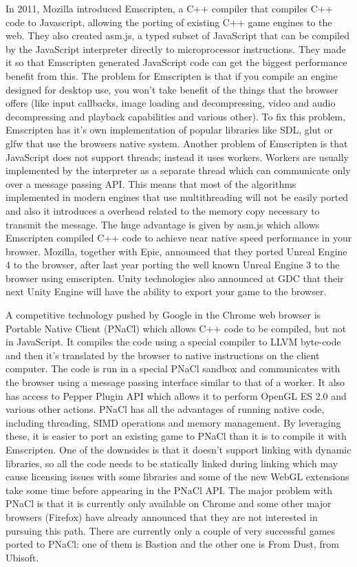 In 2011, Mozilla introduced Emscripten, a C++ compiler that compiles C++ code to
Javascript, allowing the porting of existing C++ game engines to the web. They also
created asm.js, a typed subset of JavaScript that can be compiled by the JavaScript
interpreter directly to microprocessor instructions. They made it so that Emscripten
generated JavaScript code can get the biggest performance benefit from this. The problem for Emscripten is that if you compile an engine designed for desktop use, you won’t take benefit of the things that the browser offers (like input callbacks, image loading and decompressing, video and audio decompressing and playback capabilities and various other). To fix this problem, Emscripten has it’s own implementation of popular libraries like SDL, glut or glfw that use the browsers native system. Another problem of Emscripten is that JavaScript does not support threads; instead it uses workers. Workers are usually implemented by the interpreter as a separate thread which can communicate only over a message passing API. This means that most of the algorithms implemented in modern engines that use multithreading will not be easily ported and also it introduces a overhead related to the memory copy necessary to transmit the message. The huge advantage is given by asm.js which allows Emscripten compiled C++ code to achieve near native speed performance in your browser. Mozilla, together with Epic, announced that they ported Unreal Engine 4 to the browser, after last year porting the well known Unreal Engine 3 to the browser using emscripten. Unity technologies also announced at GDC that their next Unity Engine will have the ability to export your game to the browser.


A competitive technology pushed by Google in the Chrome web browser is Portable Native
Client (PNaCl) which allows C++ code to be compiled, but not in JavaScript. It compiles
the code using a special compiler to LLVM byte-code and then it’s translated by the
browser to native instructions on the client computer. The code is run in a special PNaCl sandbox and communicates with the browser using a message passing interface similar to that of a worker. It also has access to Pepper Plugin API which allows it to perform OpenGL ES 2.0 and various other actions. PNaCl has all the advantages of running native code, including threading, SIMD operations and memory management. By leveraging these, it is easier to port an existing game to PNaCl than it is to compile it with Emscripten.
One of the downsides is that it doesn’t support linking with dynamic libraries, so all the code needs to be statically linked during linking which may cause licensing issues with some libraries and some of the new WebGL extensions take some time before appearing in the PNaCl API. The major problem with PNaCl is that it is currently only available on Chrome and some other major browsers (Firefox) have already announced that they are not interested in pursuing this path. There are currently only a couple of very successful games ported to PNaCl: one of them is Bastion and the other one is From Dust, from Ubisoft.

